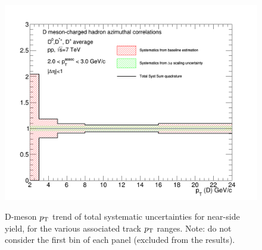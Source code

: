 \begin{figure}[!htbp]
{\includegraphics[width=0.48\linewidth, height=0.33\linewidth]{figures/FitOutput/TotalSystematicSourcesNSYield_pthad2to3.png}}
\caption{D-meson $p_{\rm T}$ trend of total systematic uncertainties for near-side yield, for the various associated track $p_{\rm T}$ ranges. Note: do not consider the first bin of each panel (excluded from the results).}
\label{fig:NSyieldTotalUnc}
\end{figure}
